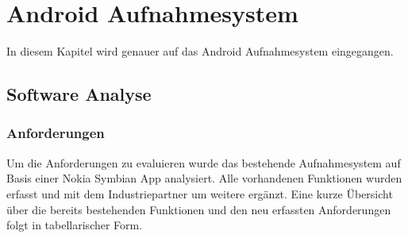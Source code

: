 \chapter{Android Aufnahmesystem}

In diesem Kapitel wird genauer auf das Android Aufnahmesystem eingegangen.

\section{Software Analyse}

\subsection{Anforderungen}

Um die Anforderungen zu evaluieren wurde das bestehende Aufnahmesystem auf Basis einer Nokia Symbian App analysiert. Alle vorhandenen Funktionen wurden erfasst und mit dem Industriepartner um weitere erg\"{a}nzt. 
Eine kurze Übersicht \"{u}ber die bereits bestehenden Funktionen und den neu erfassten Anforderungen folgt in tabellarischer Form.

